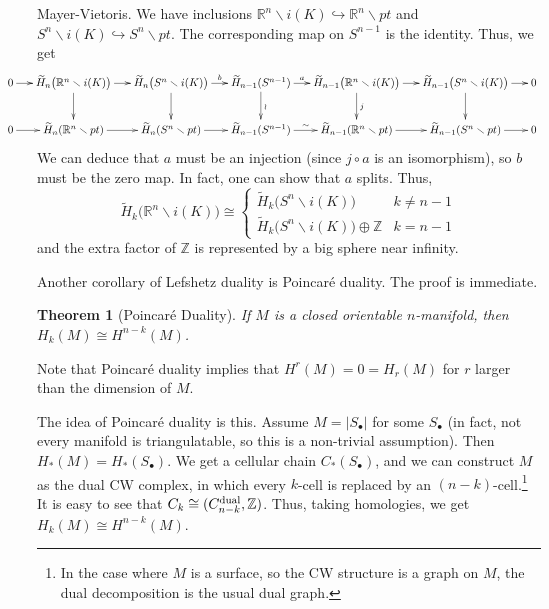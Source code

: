 \documentclass[12pt]{article}
\theoremstyle{plain}
\newtheorem{theorem}[equation]{Theorem}
\theoremstyle{definition}
\theoremstyle{remark}
\let\hom\relax %
\DeclareMathOperator{\hom}{Hom}
\renewcommand{\H}{\widetilde H}
\newcommand{\RR}{\ensuremath{\mathbb{R}}}
\newcommand{\ZZ}{\ensuremath{\mathbb{Z}}}
\begin{document}
 Mayer-Vietoris. We have inclusions $\RR^n\smallsetminus i(K)\hookrightarrow
 \RR^n\smallsetminus pt$ and $S^n\smallsetminus i(K)\hookrightarrow S^n\smallsetminus pt$.
 The corresponding map on $S^{n-1}$ is the identity. Thus, we get
 {\small
 \[\hspace*{-3em}
 \xymatrix @C-.8pc{
    0\ar[r] & \H_n\bigl(\RR^n\smallsetminus i(K)\bigr) \ar[r] \ar[d]
    & \H_n\bigl(S^n\smallsetminus i(K)\bigr) \ar[r]^<>(.5)b \ar[d]
    & \H_{n-1}(S^{n-1}) \ar[r]^<>(.5)a \ar[d]^{\wr}
    & \H_{n-1}\bigl(\RR^n\smallsetminus i(K)\bigr) \ar[r] \ar[d]^{j}
    & \H_{n-1}\bigl(S^n\smallsetminus i(K)\bigr) \ar[r] \ar[d]
    & 0\\
    0\ar[r] & \H_n(\RR^n\smallsetminus pt) \ar[r]
    & \H_n(S^n\smallsetminus pt) \ar[r]
    & \H_{n-1}(S^{n-1}) \ar[r]^<>(.5){\sim}
    & \H_{n-1}(\RR^n\smallsetminus pt) \ar[r]
    & \H_{n-1}(S^n\smallsetminus pt) \ar[r]
    & 0\\
 }\]} We can deduce that $a$ must be an injection (since $j\circ a$ is an isomorphism),
 so $b$ must be the zero map. In fact, one can show that $a$ splits. Thus,
 \[
   \H_k\bigl(\RR^n\smallsetminus i(K)\bigr) \cong \begin{cases}
   \H_k\bigl(S^n\smallsetminus i(K)\bigr) & k\neq n-1\\
   \H_k\bigl(S^n\smallsetminus i(K)\bigr)\oplus \ZZ & k= n-1
 \end{cases}\]
 and the extra factor of $\ZZ$ is represented by a big sphere near infinity.

 Another corollary of Lefshetz duality is Poincar\'e duality. The proof is immediate.
 \begin{theorem}[Poincar\'e Duality]
   If $M$ is a closed orientable $n$-manifold, then $H_k(M)\cong H^{n-k}(M)$.
 \end{theorem}
 Note that Poincar\'e duality implies that $H^r(M)=0=H_r(M)$ for $r$ larger than the
 dimension of $M$.

 The idea of Poincar\'e duality is this. Assume $M=|S_\bullet|$ for some $S_\bullet$ (in
 fact, not every manifold is triangulatable, so this is a non-trivial assumption). Then
 $H_*(M)=H_*(S_\bullet)$. We get a cellular chain $C_*(S_\bullet)$, and we can construct
 $M$ as the dual CW complex, in which every $k$-cell is replaced by an
 $(n-k)$-cell.\footnote{In the case where $M$ is a surface, so the CW structure is a
 graph on $M$, the dual decomposition is the usual dual graph.} It is easy to see that
 $C_{k}\cong \hom(C_{n-k}^\text{dual},\ZZ)$. Thus, taking homologies, we get $H_k(M)\cong
 H^{n-k}(M)$.
\end{document}
